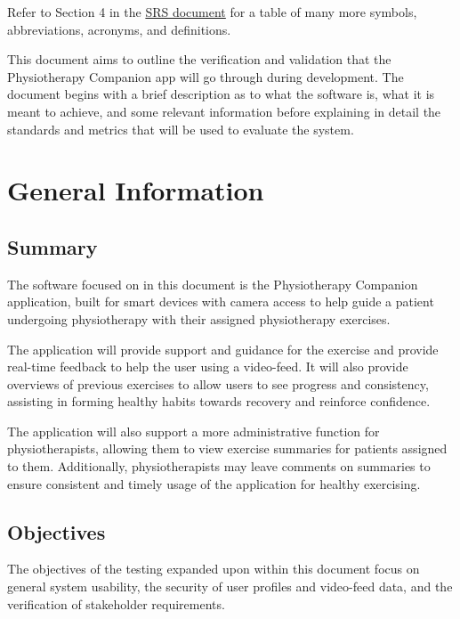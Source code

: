 \documentclass[12pt, titlepage]{article}
\begin{document}
Refer to Section 4 in the \href{https://github.com/M9Huynh/technically-functional/blob/32182cfc56c602466e270b7fcbad01d892911ea1/docs/SRS/SRS.pdf}{SRS document} for a table of many more symbols, abbreviations, acronyms, and definitions.

\newpage


This document aims to outline the verification and validation that the Physiotherapy Companion app will go through during development. The document begins with a brief description as to what the software is, what it is meant to achieve, and some relevant information before explaining in detail the standards and metrics that will be used to evaluate the system.

\section{General Information}

\subsection{Summary}

The software focused on in this document is the Physiotherapy Companion application, built for smart devices with camera access to help guide a patient undergoing physiotherapy with their assigned physiotherapy exercises.

The application will provide support and guidance for the exercise and provide real-time feedback to help the user using a video-feed. It will also provide overviews of previous exercises to allow users to see progress and consistency, assisting in forming healthy habits towards recovery and reinforce confidence.

The application will also support a more administrative function for physiotherapists, allowing them to view exercise summaries for patients assigned to them. Additionally, physiotherapists may leave comments on summaries to ensure consistent and timely usage of the application for healthy exercising.


\subsection{Objectives}

The objectives of the testing expanded upon within this document focus on general system usability, the security of user profiles and video-feed data, and the verification of stakeholder requirements.
\end{document}
